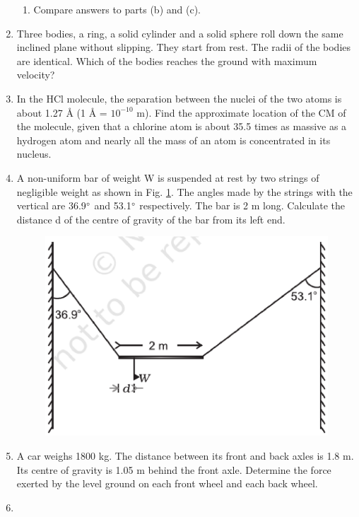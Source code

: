 \begin{enumerate}[label=\arabic*.,ref=\thesubsection.\theenumi]
\begin{enumerate}[label=(\alph*)]
\item  Compare answers to parts (b) and (c).
\end{enumerate}
\item Three bodies, a ring, a solid cylinder and a solid sphere roll down the same inclined plane without slipping. They start from rest. The radii of the bodies are identical. Which of the bodies reaches the ground with maximum velocity?
\item In the HCl molecule, the separation between the nuclei of the two atoms is about 
1.27 \si{\angstrom} (1 \si{\angstrom} = $10^{-10}$ m). 
Find the approximate location of the CM of the molecule, given that a chlorine atom is about 35.5 times as massive as a hydrogen atom and nearly all the mass of an atom is concentrated in its nucleus.
\item A non-uniform bar of weight W is suspended at rest by two strings of negligible weight as shown in Fig. \ref{fig:7.39}. The angles made by the strings with the vertical are 36.9$\degree$ and 53.1$\degree$ respectively. The bar is 2 m long. Calculate the distance d of the centre of gravity of the bar from its left end.
\begin{figure}[!ht]
\includegraphics[width=\columnwidth]{./figs/11-1/7/7.39.eps}
\caption{}
\label{fig:7.39}
\end{figure}
\item A car weighs 1800 kg. The distance between its front and back axles is 1.8 m. Its centre of gravity is 1.05 m behind the front axle. Determine the force exerted by the level ground on each front wheel and each back wheel.
\item 
\begin{enumerate}[label=(\alph*)]

\end{enumerate}
\end{enumerate}
